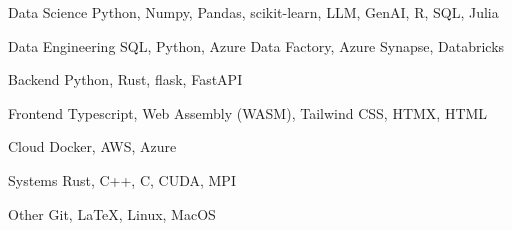 


\begin{cvskills}

\cvskill
  {Data Science} %
  {Python, Numpy, Pandas, scikit-learn, LLM, GenAI, R, SQL, Julia}

\cvskill
  {Data Engineering} %
  {SQL, Python, Azure Data Factory, Azure Synapse, Databricks}

\cvskill
  {Backend} %
  {Python, Rust, flask, FastAPI}

\cvskill
  {Frontend} %
  {Typescript, Web Assembly (WASM), Tailwind CSS, HTMX, HTML}

\cvskill
  {Cloud} %
  {Docker, AWS, Azure}

\cvskill
  {Systems} %
  {Rust, C++, C, CUDA, MPI}

\cvskill
  {Other} %
  {Git, \LaTeX, Linux, MacOS}

\end{cvskills}
